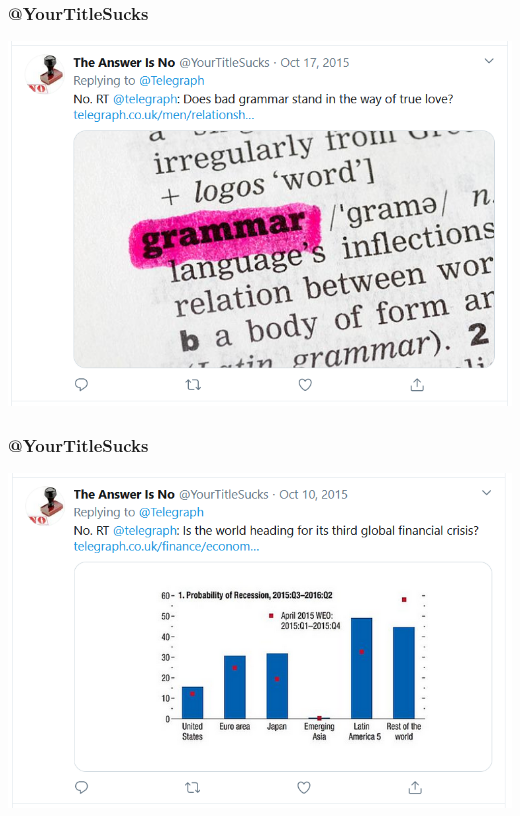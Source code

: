 \documentclass{beamer}
\begin{document}
    \begin{frame}
        \frametitle{@YourTitleSucks}
    
        \begin{center}
            \includegraphics[width=0.8\linewidth]{true_love.png}
        \end{center}
    
    \end{frame}
    \begin{frame}
        \frametitle{@YourTitleSucks}
    
        \begin{center}
            \includegraphics[width=0.8\linewidth]{crisis.png}
        \end{center}
    
    \end{frame}
\end{document}
